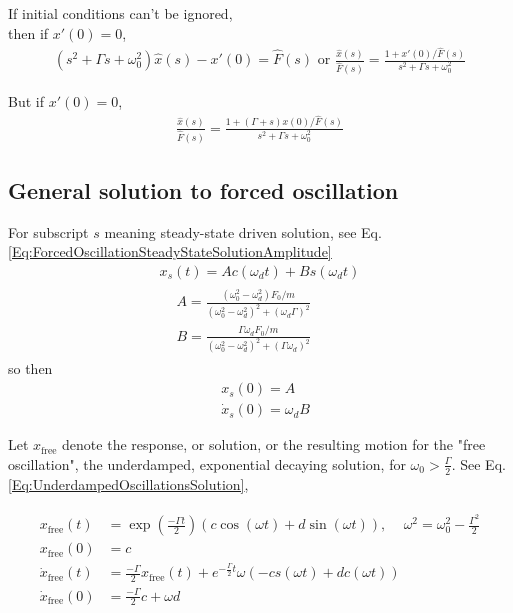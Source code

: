 \documentclass[10pt]{amsart}
\begin{document}
\begin{multicols*}{2}
If initial conditions can't be ignored, \\
then if $x'(0) =0$,
\[
\begin{gathered}
	(s^2 + \Gamma s + \omega_0^2) \widehat{x}(s) - x'(0) = \widehat{F}(s) \text{ or } \frac{ \widehat{x}(s) }{ \widehat{F}(s) } = \frac{ 1 + x'(0) / \widehat{F}(s) }{ s^2 + \Gamma s + \omega_0^2 }
\end{gathered}
\]

But if $x'(0) =0$,
\[
\begin{gathered}
	\frac{ \widehat{x}(s) }{ \widehat{F}(s) } = \frac{ 1 + (\Gamma +s )x(0) / \widehat{F}(s) }{ s^2 + \Gamma s + \omega_0^2 }
\end{gathered}
\]

\subsection{General solution to forced oscillation}

For subscript $s$ meaning steady-state driven solution, see Eq. \ref{Eq:ForcedOscillationSteadyStateSolutionAmplitude}
\[
\begin{gathered}
	x_s(t) = Ac(\omega_d t) + Bs(\omega_d t) \\
	\begin{aligned}
		& A = \frac{ (\omega_0^2 - \omega_d^2) F_0 / m }{ (\omega_0^2 - \omega_d^2)^2 + (\omega_d \Gamma)^2 } \\
		& B = \frac{ \Gamma \omega_d F_0 / m }{ (\omega_0^2 - \omega_d^2)^2 + (\Gamma \omega_d)^2 }
	\end{aligned}
\end{gathered}
\] 
so then
\[
\begin{aligned}
	& x_s(0) = A \\
	& \dot{x}_s(0) = \omega_dB
\end{aligned}
\]

Let $x_{\text{free}}$ denote the response, or solution, or the resulting motion for the "free oscillation", the underdamped, exponential decaying solution, for $\omega_0 > \frac{\Gamma}{2}$. See Eq. \ref{Eq:UnderdampedOscillationsSolution},

\[
\begin{gathered}
	\begin{aligned}
		x_{\text{free}}(t) & = \exp{ \left( \frac{-\Gamma t}{2} \right) } (c\cos{(\omega t)} + d\sin{ (\omega t)} ), \quad \, \omega^2 = \omega_0^2 -\frac{\Gamma^2}{2} \\
		x_{\text{free}}(0) &= c \\
		\dot{x}_{\text{free}}(t) & = \frac{-\Gamma}{2} x_{\text{free}}(t) + e^{-\frac{\Gamma}{2} t} \omega( - cs(\omega t) + dc(\omega t) ) \\
		\dot{x}_{\text{free}}(0) & = \frac{-\Gamma}{2} c + \omega d
	\end{aligned}
\end{gathered}
\]


\end{multicols*}
\end{document}
